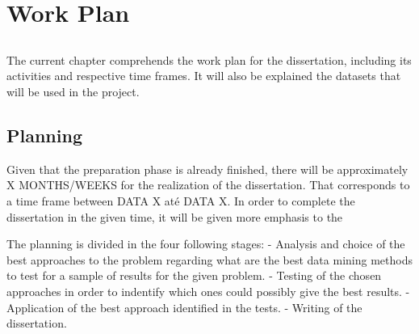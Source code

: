 \chapter{Work Plan}\label{chap:chap3}

\section*{}

The current chapter comprehends the work plan for the dissertation, including its activities and respective time frames. It will also be explained the datasets that will be used in the project.

\section{Planning}

Given that the preparation phase is already finished, there will be approximately X MONTHS/WEEKS for the realization of the dissertation. That corresponds to a time frame between DATA X até DATA X. In order to complete the dissertation in the given time, it will be given more emphasis to the 

The planning is divided in the four following stages:
- Analysis and choice of the best approaches to the problem regarding what are the best data mining methods to test for a sample of results for the given problem.
- Testing of the chosen approaches in order to indentify which ones could possibly give the best results.
- Application of the best approach identified in the tests.
- Writing of the dissertation.





